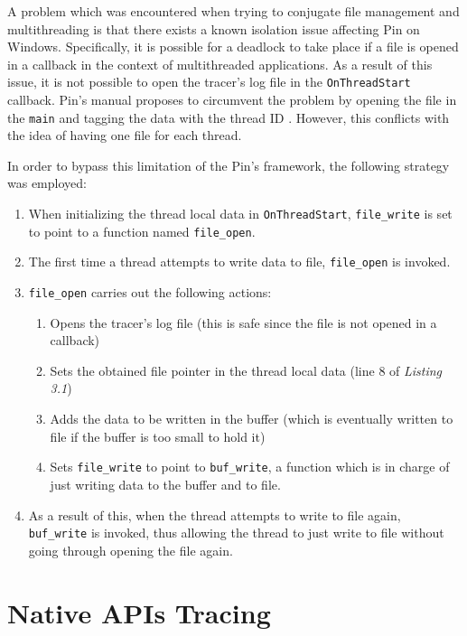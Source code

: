 A problem which was encountered when trying to conjugate file management and multithreading is that there exists a known isolation issue affecting Pin on Windows. Specifically, it is possible for a deadlock to take place if a file is opened in a callback in the context of multithreaded applications. As a result of this issue, it is not possible to open the tracer's log file in the \texttt{OnThreadStart} callback. Pin's manual proposes to circumvent the problem by opening the file in the \texttt{main} and tagging the data with the thread ID \cite{Pin}. However, this conflicts with the idea of having one file for each thread.

In order to bypass this limitation of the Pin's framework, the following strategy was employed:
\begin{enumerate}
\item When initializing the thread local data in \texttt{OnThreadStart}, \texttt{file\_write} is set to point to a function named \texttt{file\_open}.
\item The first time a thread attempts to write data to file, \texttt{file\_open} is invoked.
\item \texttt{file\_open} carries out the following actions:
\begin{enumerate}
\item Opens the tracer's log file (this is safe since the file is not opened in a callback)
\item Sets the obtained file pointer in the thread local data (line 8 of \textit{Listing 3.1})
\item Adds the data to be written in the buffer (which is eventually written to file if the buffer is too small to hold it)
\item Sets \texttt{file\_write} to point to \texttt{buf\_write}, a function which is in charge of just writing data to the buffer and to file.
\end{enumerate}
\item As a result of this, when the thread attempts to write to file again, \texttt{buf\_write} is invoked, thus allowing the thread to just write to file without going through opening the file again.   
\end{enumerate}   

\section{Native APIs Tracing}

